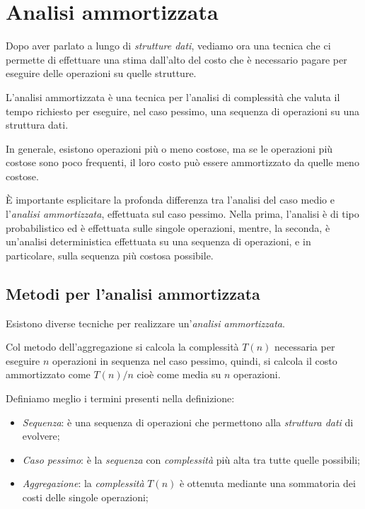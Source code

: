 \chapter{Analisi ammortizzata}
Dopo aver parlato a lungo di \emph{strutture dati}, vediamo ora una tecnica che
ci permette di effettuare una stima dall'alto del costo che è necessario pagare
per eseguire delle operazioni su quelle strutture.
\begin{definition}
    L'analisi ammortizzata è una tecnica per l'analisi di complessità che valuta
    il tempo richiesto per eseguire, nel caso pessimo, una sequenza di operazioni
    su una struttura dati.
\end{definition}\noindent
In generale, esistono operazioni più o meno costose, ma se le operazioni più
costose sono poco frequenti, il loro costo può essere ammortizzato da quelle
meno costose.

È importante esplicitare la profonda differenza tra l'analisi del caso medio
e l'\emph{analisi ammortizzata}, effettuata sul caso pessimo. Nella prima,
l'analisi è di tipo probabilistico ed è effettuata sulle singole operazioni,
mentre, la seconda, è un'analisi deterministica effettuata su una sequenza di
operazioni, e in particolare, sulla sequenza più costosa possibile.

\section{Metodi per l'analisi ammortizzata}
Esistono diverse tecniche per realizzare un'\emph{analisi ammortizzata}.

\begin{definition}
    Col metodo dell'aggregazione si calcola la complessità $T(n)$ necessaria
    per eseguire $n$ operazioni in sequenza nel caso pessimo, quindi, si calcola
    il costo ammortizzato come $T(n)/n$ cioè come media su $n$ operazioni.
\end{definition}

\noindent
Definiamo meglio i termini presenti nella definizione:
\begin{itemize}
    \item \emph{Sequenza}: è una sequenza di operazioni che permettono alla
    \emph{struttura dati} di evolvere;
    \item \emph{Caso pessimo}: è la \emph{sequenza} con \emph{complessità} più
    alta tra tutte quelle possibili;
    \item \emph{Aggregazione}: la \emph{complessità} $T(n)$ è ottenuta mediante
    una sommatoria dei costi delle singole operazioni;
\end{itemize}

